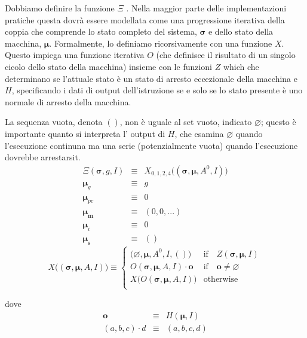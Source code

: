 \documentclass[9pt,oneside]{amsart}
\begin{document}
\begin{multicols}{2}
Dobbiamo definire la funzione $\Xi$ . Nella maggior parte delle implementazioni pratiche questa dovrà essere modellata come una progressione iterativa della coppia che comprende lo stato completo del sistema, $\boldsymbol{\sigma}$ e dello stato della macchina, $\boldsymbol{\mu}$. Formalmente, lo definiamo ricorsivamente con una funzione $X$. Questo impiega una funzione iterativa $O$ (che definisce il risultato di un singolo cicolo dello stato della macchina) insieme con le funzioni $Z$ which che determinano se l'attuale stato è un stato di arresto eccezionale della macchina e $H$, specificando i dati di output dell'istruzione se e solo se lo stato presente è uno normale di arresto della macchina.

La sequenza vuota, denota $()$, non è uguale al set vuoto, indicato $\varnothing$; questo è importante quanto si interpreta l' output di $H$, che esamina $\varnothing$ quando l'esecuzione continuna ma una serie (potenzialmente vuota) quando l'esecuzione dovrebbe arrestarsit.
\begin{eqnarray}
\Xi(\boldsymbol{\sigma}, g, I) & \equiv & X_{0,1,2,4}\big((\boldsymbol{\sigma}, \boldsymbol{\mu}, A^0, I)\big) \\
\boldsymbol{\mu}_g & \equiv & g \\
\boldsymbol{\mu}_{pc} & \equiv & 0 \\
\boldsymbol{\mu}_\mathbf{m} & \equiv & (0, 0, ...) \\
\boldsymbol{\mu}_i & \equiv & 0 \\
\boldsymbol{\mu}_\mathbf{s} & \equiv & ()
\end{eqnarray}
\begin{equation}
X\big( (\boldsymbol{\sigma}, \boldsymbol{\mu}, A, I) \big) \equiv \begin{cases}
\big(\varnothing, \boldsymbol{\mu}, A^0, I, ()\big) & \text{if} \quad Z(\boldsymbol{\sigma}, \boldsymbol{\mu}, I)\\
O(\boldsymbol{\sigma}, \boldsymbol{\mu}, A, I) \cdot \mathbf{o} & \text{if} \quad \mathbf{o} \neq \varnothing\\
X\big(O(\boldsymbol{\sigma}, \boldsymbol{\mu}, A, I)\big) & \text{otherwise}\\
\end{cases}
\end{equation}

dove
\begin{eqnarray}
\mathbf{o} & \equiv & H(\boldsymbol{\mu}, I) \\
(a, b, c) \cdot d & \equiv & (a, b, c, d)
\end{eqnarray}


\end{multicols}
\end{document}
